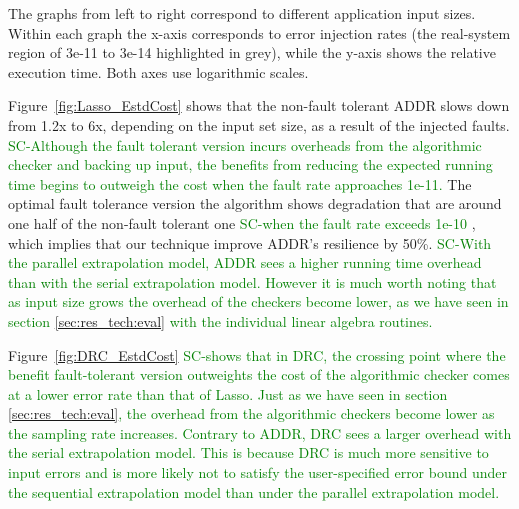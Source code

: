 \documentclass{sig-alternate}
\newcommand{\sui}[1]{%
  \textcolor{green}{SC-#1}
}
\begin{document}
{The graphs from left to right correspond to different application input sizes. Within each graph the x-axis corresponds to error injection rates (the real-system region of 3e-11 to 3e-14 highlighted in grey), while the y-axis shows the relative execution time. Both axes use logarithmic scales.


Figure~\ref{fig:Lasso_EstdCost} shows that the non-fault tolerant ADDR slows down from 1.2x to 6x, depending on the input set size, as a result of the injected faults.
\sui{Although the fault tolerant version incurs overheads from the algorithmic checker and backing up input, the benefits from reducing the expected running time begins to outweigh the cost when the fault rate approaches 1e-11.} The optimal fault tolerance version the algorithm shows degradation that are around one half of the non-fault tolerant one \sui{when the fault rate exceeds 1e-10}, which implies that our technique improve ADDR's resilience by 50\%.
\sui{With the parallel extrapolation model, ADDR sees a higher running time overhead than with the serial extrapolation model. However it is much worth noting that as input size grows the overhead of the checkers become lower, as we have seen in section \ref{sec:res_tech:eval} with the individual linear algebra routines.}

Figure~\ref{fig:DRC_EstdCost}
\sui{shows that in DRC, the crossing point where the benefit fault-tolerant version outweights the cost of the algorithmic checker comes at a lower error rate than
that of Lasso. Just as we have seen in section \ref{sec:res_tech:eval}, the overhead from the algorithmic checkers become lower as the sampling rate increases.
Contrary to ADDR, DRC sees a larger overhead with the serial extrapolation model. This is because DRC is much more sensitive to input errors and is more likely
not to satisfy the user-specified error bound under the sequential extrapolation model than under the parallel extrapolation model.
}

}
\end{document}
